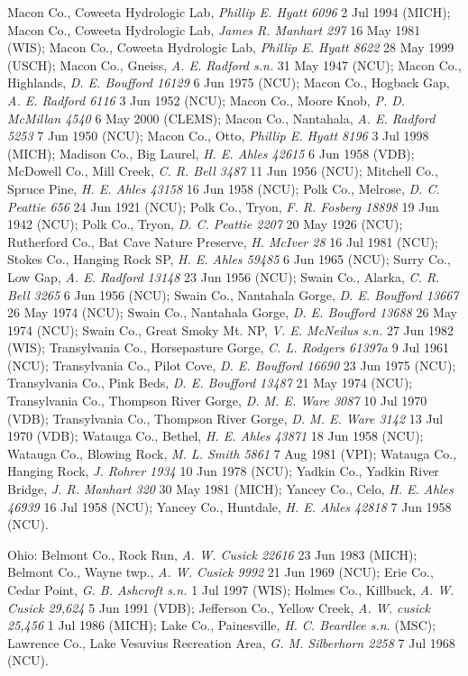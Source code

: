 \documentclass{article}
\begin{document}
\begin{sloppypar}
Macon Co., Coweeta Hydrologic Lab, \textit{Phillip E. Hyatt 6096} 2 Jul 1994 (MICH);
Macon Co., Coweeta Hydrologic Lab, \textit{James R. Manhart 297} 16 May 1981 (WIS);
Macon Co., Coweeta Hydrologic Lab, \textit{Phillip E. Hyatt 8622} 28 May 1999 (USCH);
Macon Co., Gneiss, \textit{A. E. Radford s.n.} 31 May 1947 (NCU);
Macon Co., Highlands, \textit{D. E. Boufford 16129} 6 Jun 1975 (NCU);
Macon Co., Hogback Gap, \textit{A. E. Radford 6116} 3 Jun 1952 (NCU);
Macon Co., Moore Knob, \textit{P. D. McMillan 4540} 6 May 2000 (CLEMS);
Macon Co., Nantahala, \textit{A. E. Radford 5253} 7 Jun 1950 (NCU);
Macon Co., Otto, \textit{Phillip E. Hyatt 8196} 3 Jul 1998 (MICH);
Madison Co., Big Laurel, \textit{H. E. Ahles 42615} 6 Jun 1958 (VDB);
McDowell Co., Mill Creek, \textit{C. R. Bell 3487} 11 Jun 1956 (NCU);
Mitchell Co., Spruce Pine, \textit{H. E. Ahles 43158} 16 Jun 1958 (NCU);
Polk Co., Melrose, \textit{D. C. Peattie 656} 24 Jun 1921 (NCU);
Polk Co., Tryon, \textit{F. R. Fosberg 18898} 19 Jun 1942 (NCU);
Polk Co., Tryon, \textit{D. C. Peattie 2207} 20 May 1926 (NCU);
Rutherford Co., Bat Cave Nature Preserve, \textit{H. McIver 28} 16 Jul 1981 (NCU);
Stokes Co., Hanging Rock SP, \textit{H. E. Ahles 59485} 6 Jun 1965 (NCU);
Surry Co., Low Gap, \textit{A. E. Radford 13148} 23 Jun 1956 (NCU);
Swain Co., Alarka, \textit{C. R. Bell 3265} 6 Jun 1956 (NCU);
Swain Co., Nantahala Gorge, \textit{D. E. Boufford 13667} 26 May 1974 (NCU);
Swain Co., Nantahala Gorge, \textit{D. E. Boufford 13688} 26 May 1974 (NCU);
Swain Co., Great Smoky Mt. NP, \textit{V. E. McNeilus s.n.} 27 Jun 1982 (WIS);
Transylvania Co., Horsepasture Gorge, \textit{C. L. Rodgers 61397a} 9 Jul 1961 (NCU);
Transylvania Co., Pilot Cove, \textit{D. E. Boufford 16690} 23 Jun 1975 (NCU);
Transylvania Co., Pink Beds, \textit{D. E. Boufford 13487} 21 May 1974 (NCU);
Transylvania Co., Thompson River Gorge, \textit{D. M. E. Ware 3087} 10 Jul 1970 (VDB);
Transylvania Co., Thompson River Gorge, \textit{D. M. E. Ware 3142} 13 Jul 1970 (VDB);
Watauga Co., Bethel, \textit{H. E. Ahles 43871} 18 Jun 1958 (NCU);
Watauga Co., Blowing Rock, \textit{M. L. Smith 5861} 7 Aug 1981 (VPI);
Watauga Co., Hanging Rock, \textit{J. Rohrer 1934} 10 Jun 1978 (NCU);
Yadkin Co.,  Yadkin River Bridge, \textit{J. R. Manhart 320} 30 May 1981 (MICH);
Yancey Co., Celo, \textit{H. E. Ahles 46939} 16 Jul 1958 (NCU);
Yancey Co., Huntdale, \textit{H. E. Ahles 42818} 7 Jun 1958 (NCU).
\end{sloppypar}

Ohio:
Belmont Co., Rock Run, \textit{A. W. Cusick 22616} 23 Jun 1983 (MICH);
Belmont Co., Wayne twp., \textit{A. W. Cusick 9992} 21 Jun 1969 (NCU);
Erie Co., Cedar Point, \textit{G. B. Ashcroft s.n.} 1 Jul 1997 (WIS);
Holmes Co., Killbuck, \textit{A. W. Cusick 29,624} 5 Jun 1991 (VDB);
Jefferson Co., Yellow Creek, \textit{A. W. cusick 25,456} 1 Jul 1986 (MICH);
Lake Co., Painesville, \textit{H. C. Beardlee s.n.}  (MSC);
Lawrence Co., Lake Vesuvius Recreation Area, \textit{G. M. Silberhorn 2258} 7 Jul 1968 (NCU).
\end{document}
